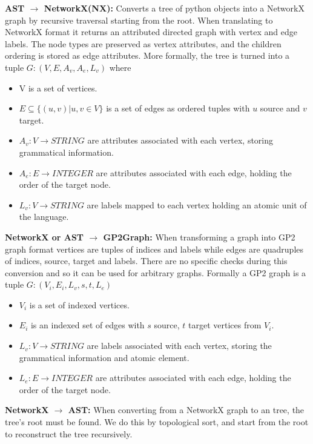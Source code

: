 \documentclass[runningheads]{llncs}
\begin{document}
\noindent\textbf{\essence AST $\rightarrow$ NetworkX(NX):} Converts a tree of python objects into a NetworkX graph by recursive traversal starting from the root.
When translating to NetworkX format it returns an attributed directed graph with vertex and edge labels. The node types are preserved as vertex attributes, and the children ordering is stored as edge attributes. More formally, the tree is turned into a tuple $G : (V, E, A_v,A_e, L_v)$ where
\begin{itemize}
    \item V is a set of vertices.
    \item $E \subseteq \{(u,v) | u,v \in V\}$ is a set of edges as ordered tuples with $u$ source and $v$ target.
    \item $A_v : V \rightarrow STRING$ are attributes associated with each vertex, storing grammatical information.
    \item $A_e : E \rightarrow INTEGER$ are attributes associated with each edge, holding the order of the target node.
    \item $L_v : V \rightarrow STRING$ are labels mapped to each vertex holding an atomic unit of the \essence language.
\end{itemize}

\noindent \textbf{NetworkX or \essence AST $\rightarrow$  GP2Graph:} When transforming a graph into GP2 graph format vertices are tuples of indices and labels while edges are quadruples of indices, source, target and labels. There are no \essence specific checks during this conversion and so it can be used for arbitrary graphs. Formally a GP2 graph is a tuple $G: (V_i,E_i,L_v,s,t,L_e)$
\begin{itemize}
    \item $V_i$ is a set of indexed vertices.
    \item $E_i$ is an indexed set of edges with $s$ source, $t$ target vertices from $V_i$.
    \item $L_v : V \rightarrow STRING$ are labels associated with each vertex, storing the grammatical information and atomic element.
    \item $L_e : E \rightarrow INTEGER$ are attributes associated with each edge, holding the order of the target node.
\end{itemize}


\noindent\textbf{NetworkX $\rightarrow$ \essence AST:} When converting from a NetworkX graph to an \essence tree, the tree's root must be found. We do this by topological sort, and start from the root to reconstruct the tree recursively.
\end{document}
